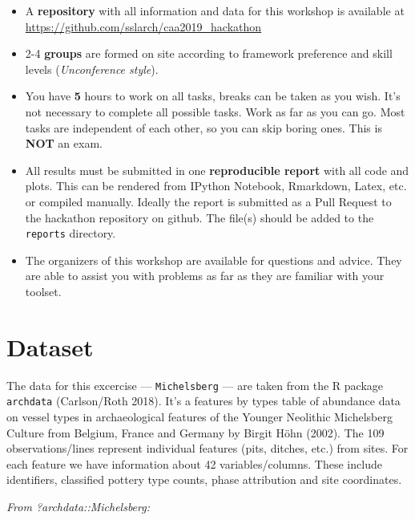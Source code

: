 \documentclass[a3, ruledsections, 8pt]{sciposter}
\begin{document}
\begin{itemize}
\item A \textbf{repository} with all information and data for this workshop is available at \newline \url{https://github.com/sslarch/caa2019_hackathon}
\item 2-4 \textbf {groups} are formed on site according to framework preference and skill levels (\textit{Unconference style}).
\item You have \textbf{5} hours to work on all tasks, breaks can be taken as you wish. It's not necessary to complete all possible tasks. Work as far as you can go. Most tasks are independent of each other, so you can skip boring ones. This is \textbf{NOT} an exam.
\item All results must be submitted in one \textbf{reproducible report} with all code and plots. This can be rendered from IPython Notebook, Rmarkdown, Latex, etc. or compiled manually. Ideally the report is submitted as a Pull Request to the hackathon repository on github. The file(s) should be added to the \verb|reports| directory.
\item The organizers of this workshop are available for questions and advice. They are able to assist you with problems as far as they are familiar with your toolset.
\end{itemize}

\section{Dataset}

The data for this excercise --- \verb|Michelsberg| --- are taken from the R package \verb|archdata| (Carlson/Roth 2018). It's a features by types table of abundance data on vessel types in archaeological features of the Younger Neolithic Michelsberg Culture from Belgium, France and Germany by Birgit Höhn (2002). The 109 observations/lines represent individual features (pits, ditches, etc.) from sites. For each feature we have information about 42 variables/columns. These include identifiers, classified pottery type counts, phase attribution and site coordinates.

\bigskip

\textit{From ?archdata::Michelsberg:}
\end{document}
